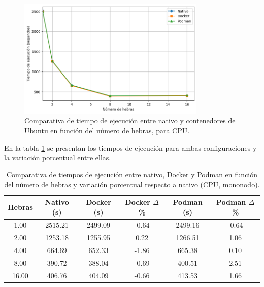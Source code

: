 \begin{figure}[H]
    \centering
    \includegraphics[width=0.8\textwidth]{imagenes/cap5/single-node_ubuntu_container_vs_native_time.png}
    \caption{Comparativa de tiempo de ejecución entre nativo y contenedores de Ubuntu en función del número de hebras, para CPU.}
    \label{fig:single-node_ubuntu_container_vs_native_time}
\end{figure}

En la tabla \ref{tab:single-node_ubuntu_container_vs_native} se presentan los tiempos de ejecución para ambas configuraciones y la variación porcentual entre ellas.

\begin{table}[ht]
    \centering
    \begin{tabular}{|c|c|c|c|c|c|}
        \hline
        \textbf{Hebras} & \textbf{Nativo (s)} & \textbf{Docker (s)} & \textbf{Docker $\Delta$\%} & \textbf{Podman (s)} & \textbf{Podman $\Delta$\%} \\
        \hline
        1.00            & 2515.21             & 2499.09             & -0.64                      & 2499.16             & -0.64                      \\
        2.00            & 1253.18             & 1255.95             & 0.22                       & 1266.51             & 1.06                       \\
        4.00            & 664.69              & 652.33              & -1.86                      & 665.38              & 0.10                       \\
        8.00            & 390.72              & 388.04              & -0.69                      & 400.51              & 2.51                       \\
        16.00           & 406.76              & 404.09              & -0.66                      & 413.53              & 1.66                       \\
        \hline
    \end{tabular}
    \caption{Comparativa de tiempos de ejecución entre nativo, Docker y Podman en función del número de hebras y variación porcentual respecto a nativo (CPU, mononodo).}
    \label{tab:single-node_ubuntu_container_vs_native}
\end{table}

